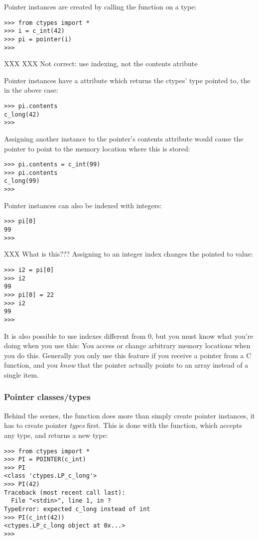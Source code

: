 Pointer instances are created by calling the  function on a
 type:
\begin{verbatim}
>>> from ctypes import *
>>> i = c_int(42)
>>> pi = pointer(i)
>>>
\end{verbatim}

XXX XXX Not correct: use indexing, not the contents atribute

Pointer instances have a  attribute which returns the
ctypes' type pointed to, the  in the above case:
\begin{verbatim}
>>> pi.contents
c_long(42)
>>>
\end{verbatim}

Assigning another  instance to the pointer's contents
attribute would cause the pointer to point to the memory location
where this is stored:
\begin{verbatim}
>>> pi.contents = c_int(99)
>>> pi.contents
c_long(99)
>>>
\end{verbatim}

Pointer instances can also be indexed with integers:
\begin{verbatim}
>>> pi[0]
99
>>>
\end{verbatim}

XXX What is this???
Assigning to an integer index changes the pointed to value:
\begin{verbatim}
>>> i2 = pi[0]
>>> i2
99
>>> pi[0] = 22
>>> i2
99
>>>
\end{verbatim}

It is also possible to use indexes different from 0, but you must know
what you're doing when you use this: You access or change arbitrary
memory locations when you do this. Generally you only use this feature
if you receive a pointer from a C function, and you \emph{know} that the
pointer actually points to an array instead of a single item.


\subsubsection{Pointer classes/types\label{ctypes-pointer-classestypes}}

Behind the scenes, the  function does more than simply
create pointer instances, it has to create pointer \emph{types} first.
This is done with the  function, which accepts any
 type, and returns a new type:
\begin{verbatim}
>>> from ctypes import *
>>> PI = POINTER(c_int)
>>> PI
<class 'ctypes.LP_c_long'>
>>> PI(42)
Traceback (most recent call last):
  File "<stdin>", line 1, in ?
TypeError: expected c_long instead of int
>>> PI(c_int(42))
<ctypes.LP_c_long object at 0x...>
>>>
\end{verbatim}


